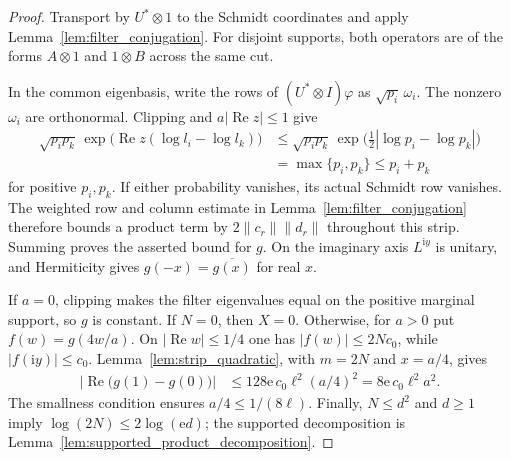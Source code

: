 \begin{proof}\leanok
    Transport by $U^*\otimes1$ to the Schmidt coordinates and apply
    Lemma~\ref{lem:filter_conjugation}. For disjoint supports, both operators
    are of the forms $A\otimes1$ and $1\otimes B$ across the same cut.

    In the common eigenbasis, write the rows of
    $(U^*\otimes I)\varphi$ as $\sqrt{p_i}\,\omega_i$. The nonzero
    $\omega_i$ are orthonormal. Clipping and
    $a|\operatorname{Re}z|\le1$ give
    \begin{align*}
        \sqrt{p_ip_k}\,
        \exp\bigl(\operatorname{Re}z(\log l_i-\log l_k)\bigr)
         & \le\sqrt{p_ip_k}\,
        \exp\bigl(\tfrac12|\log p_i-\log p_k|\bigr) \\
         & =\max\{p_i,p_k\}\le p_i+p_k
    \end{align*}
    for positive $p_i,p_k$. If either probability vanishes, its actual
    Schmidt row vanishes. The weighted row and column estimate in
    Lemma~\ref{lem:filter_conjugation} therefore bounds a product term by
    $2\|c_r\|\|d_r\|$ throughout this strip. Summing proves the asserted
    bound for $g$. On the imaginary axis $L^{\mathrm iy}$ is unitary, and
    Hermiticity gives $g(-x)=\overline{g(x)}$ for real $x$.

    If $a=0$, clipping makes the filter eigenvalues equal on the positive
    marginal support, so $g$ is constant. If $N=0$, then $X=0$. Otherwise,
    for $a>0$ put $f(w)=g(4w/a)$. On
    $|\operatorname{Re}w|\le1/4$ one has $|f(w)|\le2Nc_0$, while
    $|f(\mathrm iy)|\le c_0$. Lemma~\ref{lem:strip_quadratic}, with
    $m=2N$ and $x=a/4$, gives
    \begin{align*}
        \bigl|\operatorname{Re}\bigl(g(1)-g(0)\bigr)\bigr|
         & \le128\mathrm e\,c_0\ell^2(a/4)^2
        =8\mathrm e\,c_0\ell^2a^2.
    \end{align*}
    The smallness condition ensures $a/4\le1/(8\ell)$. Finally,
    $N\le d^2$ and $d\ge1$ imply
    $\log(2N)\le2\log(\mathrm e d)$; the supported decomposition is
    Lemma~\ref{lem:supported_product_decomposition}.
\end{proof}


